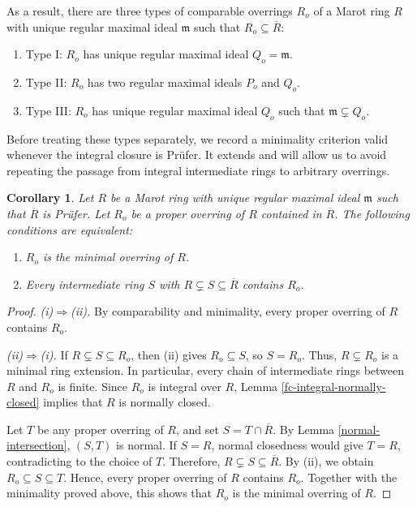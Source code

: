 \documentclass[12pt]{article}
\newtheorem{corollary}{Corollary}
\begin{document}
As a result, there are three types of comparable overrings $R_o$ of a Marot ring $R$ with unique regular maximal ideal $\mathfrak m$ such that $R_o\subseteq\overline R$:
\begin{enumerate}[label=\arabic*.]
    \item Type I: $R_o$ has unique regular maximal ideal $Q_o=\mathfrak m$.
    \item Type II: $R_o$ has two regular maximal ideals $P_o$ and $Q_o$.
    \item Type III: $R_o$ has unique regular maximal ideal $Q_o$ such that $\mathfrak m\subsetneq Q_o$.
\end{enumerate}

Before treating these types separately, we record a minimality criterion valid whenever the integral closure is Prüfer. It extends \cite[Corollary 28]{ayache} and will allow us to avoid repeating the passage from integral intermediate rings to arbitrary overrings.

\begin{corollary}\label{integral-minimal-characterization}
		Let $R$ be a Marot ring with unique regular maximal ideal $\mathfrak{m}$ such that $\overline R$ is Prüfer. Let $R_o$ be a proper overring of $R$ contained in $\overline R$. The following conditions are equivalent:
		\begin{enumerate}[label=(\roman*)]
			\item $R_o$ is the minimal overring of $R$.
			\item Every intermediate ring $S$ with $R\subsetneq S\subseteq\overline R$ contains $R_o$.
		\end{enumerate}
	\end{corollary}
	
	\begin{proof}
		\emph{(i)$\Rightarrow$(ii).} By comparability and minimality, every proper overring of $R$ contains $R_o$.
		
		\emph{(ii)$\Rightarrow$(i).} If $R\subsetneq S\subseteq R_o$, then (ii) gives $R_o\subseteq S$, so $S=R_o$. Thus, $R\subsetneq R_o$ is a minimal ring extension. In particular, every chain of intermediate rings between $R$ and $R_o$ is finite. Since $R_o$ is integral over $R$, Lemma \ref{fc-integral-normally-closed} implies that $R$ is normally closed.
		
		Let $T$ be any proper overring of $R$, and set $S=T\cap\overline R$. By Lemma \ref{normal-intersection}, $(S,T)$ is normal. If $S=R$, normal closedness would give $T=R$, contradicting to the choice of $T$. Therefore, $R\subsetneq S\subseteq\overline R.$ By (ii), we obtain $R_o\subseteq S\subseteq T$. Hence, every proper overring of $R$ contains $R_o$. Together with the minimality proved above, this shows that $R_o$ is the minimal overring of $R$.
	\end{proof}
\end{document}
